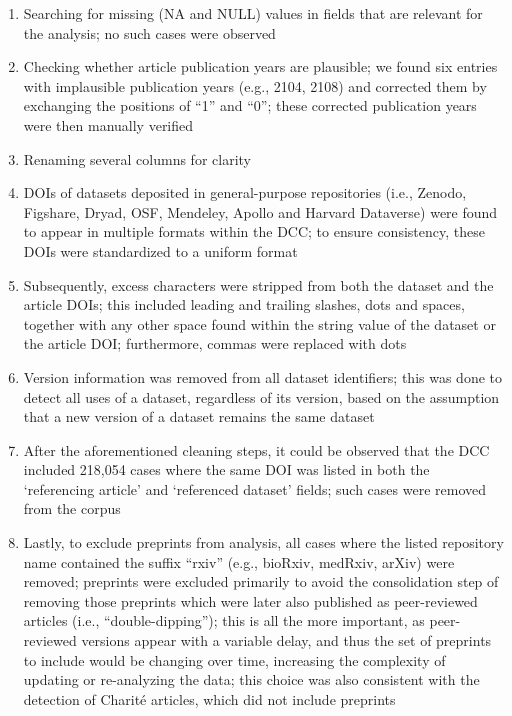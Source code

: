 \documentclass[
  letterpaper,
  DIV=11,
  numbers=noendperiod]{scrartcl}
\begin{document}
\begin{enumerate}
\def\labelenumi{(\arabic{enumi})}
\item
  Searching for missing (NA and NULL) values in fields that are relevant
  for the analysis; no such cases were observed
\item
  Checking whether article publication years are plausible; we found six
  entries with implausible publication years (e.g., 2104, 2108) and
  corrected them by exchanging the positions of ``1'' and ``0''; these
  corrected publication years were then manually verified
\item
  Renaming several columns for clarity
\item
  DOIs of datasets deposited in general-purpose repositories (i.e.,
  Zenodo, Figshare, Dryad, OSF, Mendeley, Apollo and Harvard Dataverse)
  were found to appear in multiple formats within the DCC; to ensure
  consistency, these DOIs were standardized to a uniform format
\item
  Subsequently, excess characters were stripped from both the dataset
  and the article DOIs; this included leading and trailing slashes, dots
  and spaces, together with any other space found within the string
  value of the dataset or the article DOI; furthermore, commas were
  replaced with dots
\item
  Version information was removed from all dataset identifiers; this was
  done to detect all uses of a dataset, regardless of its version, based
  on the assumption that a new version of a dataset remains the same
  dataset
\item
  After the aforementioned cleaning steps, it could be observed that the
  DCC included 218,054 cases where the same DOI was listed in both the
  `referencing article' and `referenced dataset' fields; such cases were
  removed from the corpus
\item
  Lastly, to exclude preprints from analysis, all cases where the listed
  repository name contained the suffix ``rxiv'' (e.g., bioRxiv, medRxiv,
  arXiv) were removed; preprints were excluded primarily to avoid the
  consolidation step of removing those preprints which were later also
  published as peer-reviewed articles (i.e., ``double-dipping''); this
  is all the more important, as peer-reviewed versions appear with a
  variable delay, and thus the set of preprints to include would be
  changing over time, increasing the complexity of updating or
  re-analyzing the data; this choice was also consistent with the
  detection of Charité articles, which did not include preprints
\end{enumerate}
\end{document}
